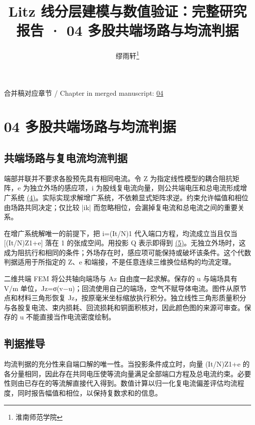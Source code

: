 \documentclass[journal,10pt]{IEEEtran}
\begin{document}
\title{Litz 线分层建模与数值验证：完整研究报告 · 04 多股共端场路与均流判据}
\author{缪雨轩\thanks{淮南师范学院}}

\maketitle
\noindent 合并稿对应章节 / Chapter in merged manuscript: \href{report_zh-CN_ieee.pdf#chapter-04}{04}\par
\FloatBarrier
\section*{04 多股共端场路与均流判据}
\hypertarget{chapter-04}{}
\subsection*{共端场路与复电流均流判据}
\hypertarget{04.common.heading}{}
端部并联并不要求各股预先具有相同电流。令 Z 为指定线性模型的耦合阻抗矩阵，e 为独立外场的感应项，i 为股线复电流向量，则公共端电压和总电流形成增广系统 \href{report_zh-CN_ieee.pdf#E04}{(4)}。实际实现求解增广系统，不依赖显式矩阵求逆。约束允许幅值和相位由场路共同决定；仅比较 |ik| 而忽略相位，会漏掉复电流和总电流之间的重要关系。


在增广系统解唯一的前提下，把 i=(It/N)1 代入端口方程，均流成立当且仅当 [(It/N)Z1+e] 落在 1 的张成空间。用投影 Q 表示即得到 \href{report_zh-CN_ieee.pdf#E05}{(5)}。无独立外场时，这成为阻抗行和相同的条件；外场存在时，感应项可能保持或破坏该条件。这个代数判据适用于所指定的 Z、e 和端接，不是任意连续三维换位结构的均流定理。


二维共端 FEM 将公共轴向端场与 Az 自由度一起求解。保存的 u 与端场具有 V/m 单位，Jz=σ(v−u)；回流使用自己的端场，空气不赋导体电流。图件从原节点和材料三角形恢复 Jz，按原毫米坐标缩放执行积分。独立线性三角形质量积分与各股复电流、束内损耗、回流损耗和铜面积核对，因此颜色图的来源可审查。保存的 u 不能直接当作电流密度绘制。


\subsection*{判据推导}
\hypertarget{04.sharing_derivation.heading}{}
均流判据的充分性来自端口解的唯一性。当投影条件成立时，向量 (It/N)Z1+e 的各分量相同，因此存在共同电压使等流向量满足全部端口方程及总电流约束。必要性则由已存在的等流解直接代入得到。数值计算以归一化复电流偏差评估均流程度，同时报告幅值和相位，以保持复数求和的信息。
\end{document}
